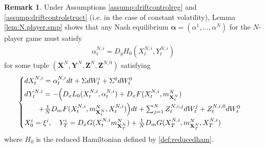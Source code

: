 \documentclass[11pt,reqno]{amsart}
\numberwithin{equation}{section}
\theoremstyle{definition}
\newtheorem{remark}[theorem]{Remark}
\newcommand{\bX}{\mathbf{X}}
\newcommand{\bY}{\mathbf{Y}}
\newcommand{\bZ}{\mathbf{Z}}
\begin{document}
\begin{remark} \label{rmk:fbsdedriftcontrol}
Under Assumptions \ref{assump:driftcontrolreg} and \ref{assump:driftcontrolstruct} (i.e. in the case of constant volatility), Lemma \ref{lem:N.player.smp} shows that any Nash equilibrium $\bm \alpha = (\alpha^1,\dots,\alpha^N)$ for the $N$-player game must satisfy 
\begin{align*}
    \alpha_t^{N,i} = D_y H_0(X_t^{N,i}, Y_t^{N,i})
\end{align*}
for some tuple $(\bX^N, \bY^N, \bZ^N, \bZ^{N,0})$ satisfying
\begin{align} \label{eq:nplayerfbsdedrift}
  \begin{cases} \vspace{.1cm}
    dX_t^{N,i} = \alpha_t^{N,i} dt + \Sigma dW_t^i + \Sigma^0 dW_t^0   \\ \vspace{.1cm}
dY_t^{N,i} = -  \Big(D_x L_0(X_t^{N,i}, \alpha_t^{N,i}) + D_x F(X_t^{N,i}, m_{\bX_t^N}^N) \\
\qquad + \frac{1}{N} D_m F(X_t^{N,i}, m_{\bX_t^N}^N, X_t^{N,i}) \Big)  dt  
+ \sum_{j = 1}^N Z_t^{N,i,j}  dW_t^j + Z_t^{N,i,0}  dW_t^0 \vspace{.1cm}  \\
X_0^i = \xi^i, \quad Y_T^i = D_x G(X_t^{N,i} m_{\bX_T^N}^N) + \frac{1}{N} D_m G(X_T^{N,i}, m_{\bX_T^N}^N, X_T^{N,i})
\end{cases} 
\end{align}
where $H_0$ is the reduced Hamiltonian defined by \eqref{def:reducedham}. 
\end{remark}
\end{document}
